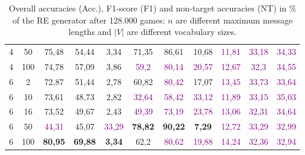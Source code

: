 \begin{table}[ht]
\begin{tabular}{cc|ccc|ccc|ccc}
        {4}                           & {50}   & {75,48}                             & {54,44}                             & {3,34}                                   & {71,35}                   & {86,61}                   & {10,68}                   & \textcolor{purple}{11,81} & \textcolor{purple}{33,18} & \textcolor{purple}{34,33} \\
        {4}                           & {100}  & {74,78}                             & {57,09}                             & {3,86}                                   & \textcolor{purple}{59,2}  & \textcolor{purple}{80,14} & \textcolor{purple}{20,57} & \textcolor{purple}{12,67} & \textcolor{purple}{32,3}  & \textcolor{purple}{34,55} \\
        {6}                           & {2}    & {72,87}                             & {51,44}                             & {2,78}                                   & {60,82}                   & \textcolor{purple}{80,42} & {17,07}                   & \textcolor{purple}{13,45} & \textcolor{purple}{33,73} & \textcolor{purple}{33,64} \\
        {6}                           & {10}   & {73,61}                             & {48,73}                             & {2,82}                                   & \textcolor{purple}{32,64} & \textcolor{purple}{58,42} & \textcolor{purple}{33,12} & \textcolor{purple}{11,89} & \textcolor{purple}{33,15} & \textcolor{purple}{35,03} \\
        {6}                           & {16}   & {73,52}                             & {49,67}                             & {2,43}                                   & \textcolor{purple}{49,39} & \textcolor{purple}{73,19} & \textcolor{purple}{23,78} & \textcolor{purple}{13,06} & \textcolor{purple}{32,31} & \textcolor{purple}{34,64} \\
        {6}                           & {50}   & \textcolor{purple}{44,31}           & {45,07}                             & \textcolor{purple}{33,29}                & {\textbf{78,82}}          & {\textbf{90,22}}          & {\textbf{7,29}}           & \textcolor{purple}{12,72} & \textcolor{purple}{33,29} & \textcolor{purple}{32,99} \\
        {6}                           & {100}  & {\textbf{80,95}}                    & {\textbf{69,88}}                    & {\textbf{3,34}}                          & {62,2}                    & \textcolor{purple}{80,62} & \textcolor{purple}{19,88} & \textcolor{purple}{14,24} & \textcolor{purple}{32,36} & \textcolor{purple}{32,94} \\
        \bottomrule
    \end{tabular}
    \caption{Overall accuracies (Acc.), F1-score (F1) and non-target accuracies (NT) in \% of the RE generator after 128.000 games: $n$ are different maximum message lengths and $|V|$ are different vocabulary sizes.}
    \label{tab:results:re-generator-game}
\end{table}

